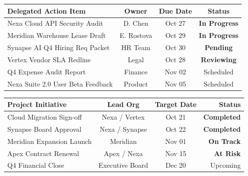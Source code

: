 \documentclass[10pt, landscape]{article}
\begin{document}
\begin{minipage}[t]{0.48\linewidth}

  \begin{tcolorbox}[execbox, title={\faTasks~ EXECUTIVE DELEGATION \& FOLLOW-UP REGISTER}]
    \setlength{\extrarowheight}{1.5pt}
    \begin{tabularx}{\linewidth}{X c c c}
      \hline
      \rowcolor{ExecNavy!10}
      \textbf{Delegated Action Item} & \textbf{Owner} & \textbf{Due Date} & \textbf{Status} \\
      \hline
      Nexa Cloud API Security Audit & D. Chen & Oct 27 & \color{ExecTeal}\textbf{In Progress} \\
      Meridian Warehouse Lease Draft & E. Rostova & Oct 29 & \color{ExecTeal}\textbf{In Progress} \\
      Synapse AI Q4 Hiring Req Packet & HR Team & Oct 30 & \color{ExecGold}\textbf{Pending} \\
      Vertex Vendor SLA Redline & Legal & Oct 28 & \color{ExecTeal}\textbf{Reviewing} \\
      Q4 Expense Audit Report & Finance & Nov 02 & \color{ExecMuted}Scheduled \\
      Nexa Suite 2.0 User Beta Feedback & Product & Nov 05 & \color{ExecMuted}Scheduled \\
      \hline
    \end{tabularx}
  \end{tcolorbox}

  \vspace{4pt}

  \begin{tcolorbox}[lightbox, title={\faListUl~ QUARTERLY MILESTONE TRACKER (Q4 2026)}]
    \small
    \begin{tabularx}{\linewidth}{X c c r}
      \hline
      \textbf{Project Initiative} & \textbf{Lead Org} & \textbf{Target Date} & \textbf{Status} \\
      \hline
      Cloud Migration Sign-off & Nexa / Vertex & Oct 21 & \color{ExecTeal}\textbf{Completed} \\
      Synapse Board Approval & Nexa / Synapse & Oct 22 & \color{ExecTeal}\textbf{Completed} \\
      Meridian Expansion Launch & Meridian & Nov 01 & \color{ExecTeal}\textbf{On Track} \\
      Apex Contract Renewal & Apex / Nexa & Nov 15 & \color{ExecGold}\textbf{At Risk} \\
      Q4 Financial Close & Executive Board & Dec 20 & \color{ExecMuted}Upcoming \\
      \hline
    \end{tabularx}
  \end{tcolorbox}

\end{minipage}
\end{document}
